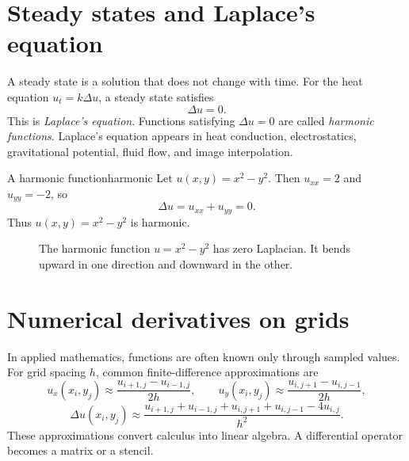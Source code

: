 \documentclass[11pt]{article}
\newcommand{\Lap}{\Delta}
\begin{document}
\section{Steady states and Laplace's equation}

A steady state is a solution that does not change with time. For the heat equation $u_t=k\Lap u$, a steady state satisfies
\[
\Lap u=0.
\]
This is \emph{Laplace's equation}. Functions satisfying $\Lap u=0$ are called \emph{harmonic functions}. Laplace's equation appears in heat conduction, electrostatics, gravitational potential, fluid flow, and image interpolation.

\begin{examplebox}{A harmonic function}{harmonic}
Let $u(x,y)=x^2-y^2$. Then $u_{xx}=2$ and $u_{yy}=-2$, so
\[
\Lap u=u_{xx}+u_{yy}=0.
\]
Thus $u(x,y)=x^2-y^2$ is harmonic.
\end{examplebox}

\begin{figure}[H]
\centering
{}
\caption{The harmonic function $u=x^2-y^2$ has zero Laplacian. It bends upward in one direction and downward in the other.}
\end{figure}

\section{Numerical derivatives on grids}

In applied mathematics, functions are often known only through sampled values. For grid spacing $h$, common finite-difference approximations are
\[
u_x(x_i,y_j)\approx \frac{u_{i+1,j}-u_{i-1,j}}{2h},
\qquad
u_y(x_i,y_j)\approx \frac{u_{i,j+1}-u_{i,j-1}}{2h},
\]
\[
\Lap u(x_i,y_j)\approx \frac{u_{i+1,j}+u_{i-1,j}+u_{i,j+1}+u_{i,j-1}-4u_{i,j}}{h^2}.
\]
These approximations convert calculus into linear algebra. A differential operator becomes a matrix or a stencil.
\end{document}
